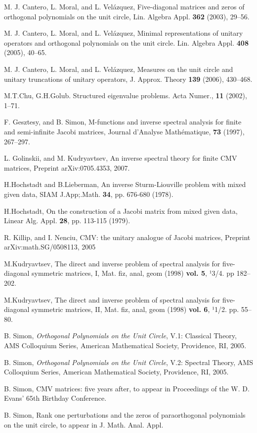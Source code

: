 \documentclass{amsart}
\begin{document}
\begin{thebibliography}{}

M. J. Cantero, L. Moral, and L. Vel\'azquez, Five-diagonal matrices
and zeros of orthogonal polynomials on the unit circle, Lin. Algebra
Appl. {\bf 362} (2003), 29--56.

M. J. Cantero, L. Moral, and L. Vel\'azquez, Minimal representations
of unitary operators and orthogonal polynomials on the unit circle.
Lin. Algebra Appl. {\bf 408} (2005), 40--65.

M. J. Cantero, L. Moral, and L. Vel\'azquez, Measures on the unit
circle and unitary truncations of unitary operators, J. Approx.
Theory {\bf 139} (2006), 430--468.

 M.T.Chu, G.H.Golub. Structured eigenvalue problems.
Acta Numer., {\bf 11} (2002), 1--71.

 F. Gesztesy, and B. Simon, M-functions and inverse spectral
analysis for finite and semi-infinite Jacobi matrices, Journal
d'Analyse Math\'ematique, {\bf 73} (1997), 267--297.

 L. Golinskii, and M. Kudryavtsev,  An inverse spectral
theory for finite CMV matrices, Preprint arXiv:0705.4353, 2007.

 H.Hochstadt and B.Lieberman, An inverse Sturm-Liouville
problem with mixed given data, SIAM J.App;.Math. {\bf 34}, pp.
676-680 (1978).

 H.Hochstadt, On the construction of a Jacobi matrix from
mixed  given data, Linear Alg. Appl. {\bf 28}, pp. 113-115 (1979).

R. Killip, and I. Nenciu, CMV: the unitary analogue of Jacobi
matrices, Preprint arXiv:math.SG/0508113, 2005

 M.Kudryavtsev, The direct and inverse problem of
spectral analysis for five-diagonal symmetric matrices, I, Mat. fiz,
anal, geom (1998) {\bf vol. 5}, ¹3/4. pp 182--202.

 M.Kudryavtsev, The direct and inverse problem of
spectral analysis for five-diagonal symmetric matrices, II, Mat.
fiz, anal, geom (1998) {\bf vol. 6}, ¹1/2. pp. 55--80.

B. Simon, {\it Orthogonal Polynomials on the Unit Circle}, V.1:
Classical Theory, AMS Colloquium Series, American Mathematical
Society, Providence, RI, 2005.

B. Simon, {\it Orthogonal Polynomials on the Unit Circle}, V.2:
Spectral Theory, AMS Colloquium Series, American Mathematical
Society, Providence, RI, 2005.

B. Simon, CMV matrices: five years after, to appear in Proceedings
of the W. D. Evans' 65th Birthday Conference.

B. Simon, Rank one perturbations and the zeros of paraorthogonal
polynomials on the unit circle, to appear in J. Math. Anal. Appl.

\end{thebibliography}
\end{document}
